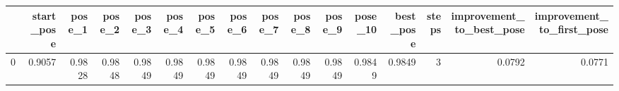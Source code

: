 \begin{tabular}{lrrrrrrrrrrrrrrr}
\toprule
{} &  start\_pose &  pose\_1 &  pose\_2 &  pose\_3 &  pose\_4 &  pose\_5 &  pose\_6 &  pose\_7 &  pose\_8 &  pose\_9 &  pose\_10 &  best\_pose &  steps &  improvement\_to\_best\_pose &  improvement\_to\_first\_pose \\
\midrule
0 &      0.9057 &  0.9828 &  0.9848 &  0.9849 &  0.9849 &  0.9849 &  0.9849 &  0.9849 &  0.9849 &  0.9849 &   0.9849 &     0.9849 &      3 &                    0.0792 &                     0.0771 \\
\bottomrule
\end{tabular}
